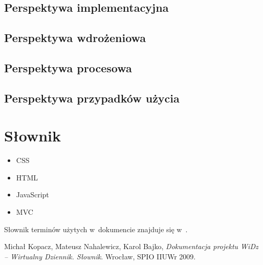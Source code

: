 \documentclass[12pt,leqno,twoside]{mwart}
\begin{document}
\subsection{Perspektywa implementacyjna}
\subsection{Perspektywa wdrożeniowa}
\subsection{Perspektywa procesowa}
\subsection{Perspektywa przypadków użycia}

\section{Słownik}
\begin{itemize}
\item CSS
\item HTML
\item JavaScript
\item MVC
\end{itemize}
\noindent Słownik terminów użytych w~dokumencie znajduje się w~\cite{SLO}.

\begin{thebibliography}{99}
 Michał Kopacz, Mateusz Nahalewicz, Karol Bajko, {\it Dokumentacja projektu WiDz -- Wirtualny Dziennik. Słownik}. Wrocław, SPIO IIUWr 2009.
\end{thebibliography}
\end{document}
